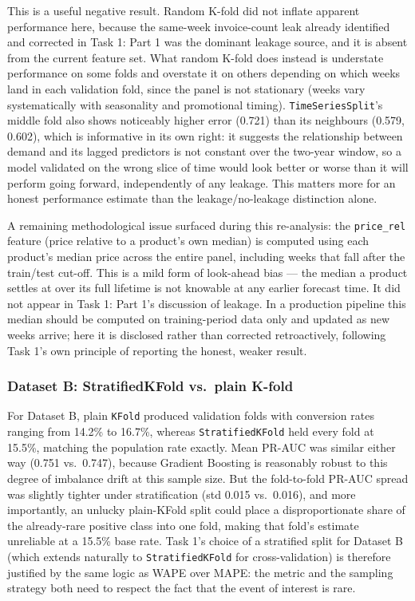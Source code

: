 This is a useful negative result. Random K-fold did not inflate apparent performance here, because
the same-week invoice-count leak already identified and corrected in Task 1: Part 1 was the
dominant leakage source, and it is absent from the current feature set. What random K-fold does
instead is understate performance on some folds and overstate it on others depending on which
weeks land in each validation fold, since the panel is not stationary (weeks vary systematically
with seasonality and promotional timing). \texttt{TimeSeriesSplit}'s middle fold also shows
noticeably higher error (0.721) than its neighbours (0.579, 0.602), which is informative in its
own right: it suggests the relationship between demand and its lagged predictors is not constant
over the two-year window, so a model validated on the wrong slice of time would look better or
worse than it will perform going forward, independently of any leakage. This matters more for an
honest performance estimate than the leakage/no-leakage distinction alone.

A remaining methodological issue surfaced during this re-analysis: the \texttt{price\_rel} feature
(price relative to a product's own median) is computed using each product's median price across
the entire panel, including weeks that fall after the train/test cut-off. This is a mild form of
look-ahead bias --- the median a product settles at over its full lifetime is not knowable at any
earlier forecast time. It did not appear in Task 1: Part 1's discussion of leakage. In a production
pipeline this median should be computed on training-period data only and updated as new weeks
arrive; here it is disclosed rather than corrected retroactively, following Task 1's own principle
of reporting the honest, weaker result.

\subsubsection*{Dataset B: StratifiedKFold vs.\ plain K-fold}

For Dataset B, plain \texttt{KFold} produced validation folds with conversion rates ranging from
14.2\% to 16.7\%, whereas \texttt{StratifiedKFold} held every fold at 15.5\%, matching the
population rate exactly. Mean PR-AUC was similar either way (0.751 vs.\ 0.747), because Gradient
Boosting is reasonably robust to this degree of imbalance drift at this sample size. But the
fold-to-fold PR-AUC spread was slightly tighter under stratification (std 0.015 vs.\ 0.016), and
more importantly, an unlucky plain-KFold split could place a disproportionate share of the
already-rare positive class into one fold, making that fold's estimate unreliable at a 15.5\% base
rate. Task 1's choice of a stratified split for Dataset B (which extends naturally to
\texttt{StratifiedKFold} for cross-validation) is therefore justified by the same logic as WAPE
over MAPE: the metric and the sampling strategy both need to respect the fact that the event of
interest is rare.

